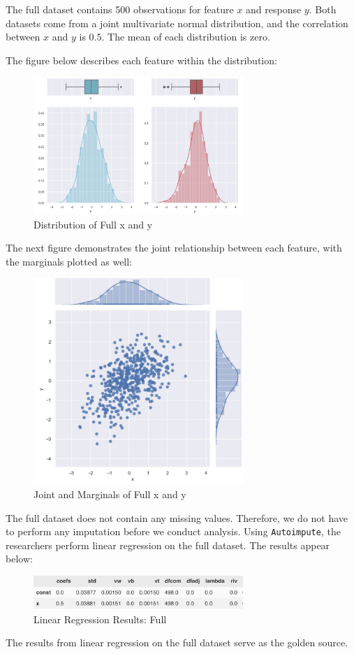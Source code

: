 \documentclass[12pt,oneside]{chicagocapstone}
\begin{document}
The full dataset contains 500 observations for feature \(x\) and
response \(y\). Both datasets come from a joint multivariate normal
distribution, and the correlation between \(x\) and \(y\) is \(0.5\).
The mean of each distribution is zero.

The figure below describes each feature within the distribution:
\begin{figure}

{\centering \includegraphics[width=300px]{figure/full-side-by-side} 

}

\caption{Distribution of Full x and y}\label{fig:fullsidebyside}
\end{figure}
The next figure demonstrates the joint relationship between each
feature, with the marginals plotted as well:
\begin{figure}

{\centering \includegraphics[width=300px]{figure/full-joint} 

}

\caption{Joint and Marginals of Full x and y}\label{fig:full-joint}
\end{figure}
The full dataset does not contain any missing values. Therefore, we do
not have to perform any imputation before we conduct analysis. Using
\texttt{Autoimpute}, the researchers perform linear regression on the
full dataset. The results appear below:
\begin{figure}

{\centering \includegraphics[width=300px]{figure/full-regression} 

}

\caption{Linear Regression Results: Full}\label{fig:full-regression}
\end{figure}
The results from linear regression on the full dataset serve as the
golden source.
\end{document}
